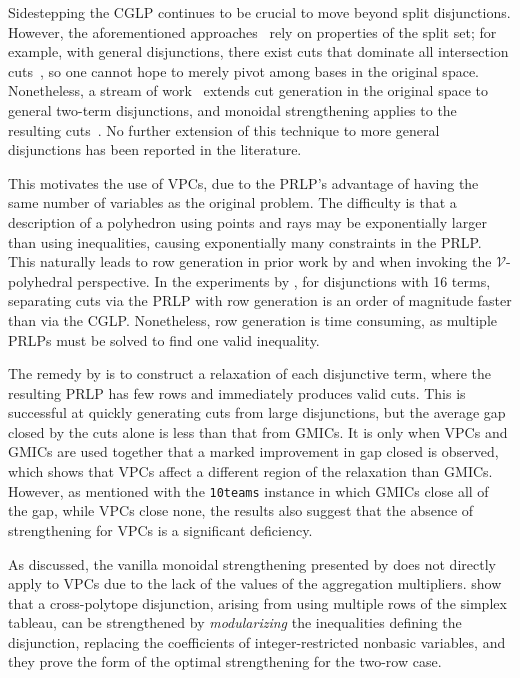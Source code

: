 \documentclass[oribibl,envcountsame]{llncs}
\theoremstyle{remark}
\theoremstyle{definition}
\newcommand{\instance}[1]{\texttt{#1}}
\begin{document}
Sidestepping the CGLP continues to be crucial to move beyond split disjunctions.
However, the aforementioned approaches~\cite{BalPer03,Bonami12} rely on properties of the split set;
for example, with general disjunctions, there exist cuts that dominate all intersection cuts~\cite{AndCorLi05,Kis14,BalKis16},
so one cannot hope to merely pivot among bases in the original space.
Nonetheless, a stream of work~\cite{JudSheRibFau06_complementarity,BonConCorMolZam13,Kis14} 
extends cut generation in the original space to general two-term disjunctions,
and monoidal strengthening applies to the resulting cuts~\cite{FisPfe17}.
No further extension of this technique to more general disjunctions has been reported in the literature.

This motivates the use of VPCs, due to the PRLP's advantage of having the same number of variables as the original problem.
The difficulty is that a description of a polyhedron using points and rays may be exponentially larger than using inequalities, causing exponentially many constraints in the PRLP.
This naturally leads to row generation in prior work by \citet{PerBal01} and \citet{LouPoiSal15} when invoking the $\mathcal{V}$-polyhedral perspective.
In the experiments by \citet{PerBal01}, for disjunctions with 16 terms, separating cuts via the PRLP with row generation is an order of magnitude faster than via the CGLP.
Nonetheless, row generation is time consuming, as multiple PRLPs must be solved to find one valid inequality.

The remedy by \citet{BalKaz22+_vpc-arxiv} is to construct a relaxation of each disjunctive term, where the resulting PRLP has few rows and immediately produces valid cuts.
This is successful at quickly generating cuts from large disjunctions,
but the average gap closed by the cuts alone is less than that from GMICs.
It is only when VPCs and GMICs are used together that a marked improvement in gap closed is observed,
which shows that VPCs affect a different region of the relaxation than GMICs.
However, as mentioned with the \instance{10teams} instance in which GMICs close all of the gap, while VPCs close none,
the results also suggest that the absence of strengthening for VPCs is a significant deficiency.

As discussed, the vanilla monoidal strengthening presented by \citet{BalJer80} does not directly apply to VPCs due to the lack of the values of the aggregation multipliers.
\citet[Section~6]{BalQua13} show that a cross-polytope disjunction, arising from using multiple rows of the simplex tableau, can be strengthened by \emph{modularizing} the inequalities defining the disjunction, replacing the coefficients of integer-restricted nonbasic variables,
and they prove the form of the optimal strengthening for the two-row case.
\end{document}
